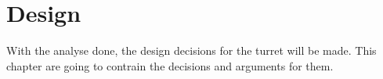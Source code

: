 \chapter{Design}\label{ch:design}
With the analyse done, the design decisions for the turret will be made. This chapter are going to contrain the decisions and arguments for them.





%